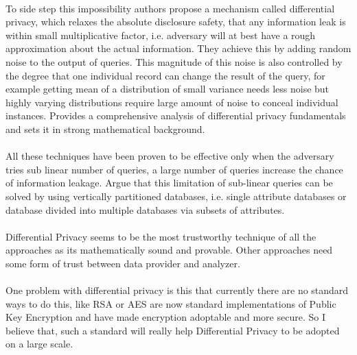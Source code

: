 \documentclass[12pt]{report}
\theoremstyle{named}
\begin{document}
\paragraph{}
To side step this impossibility authors propose a mechanism called differential privacy, which relaxes the absolute disclosure safety, that any information leak is within small multiplicative factor, i.e. adversary will at best have a rough approximation about the actual information. They achieve this by adding random noise to the output of queries. This magnitude of this noise is also controlled by the degree that one individual record can change the result of the query, for example getting mean of a distribution of small variance needs less noise but highly varying distributions require large amount of noise to conceal individual instances. \cite{dwork2014algorithmic} Provides a comprehensive analysis of differential privacy fundamentals and sets it in strong mathematical background. 
\paragraph{}
All these techniques have been proven to be effective only when the adversary tries sub linear number of queries, a large number of queries increase the chance of information leakage\cite{haeberlen2011differential}. \cite{dwork2004privacy} Argue that this limitation of sub-linear queries can be solved by using vertically partitioned databases, i.e. single attribute databases or database divided into multiple databases via subsets of attributes.
\paragraph{}
Differential Privacy seems to be the most trustworthy technique of all the approaches as its mathematically sound and provable. Other approaches need some form of trust between data provider and analyzer.
\paragraph{}
One problem with differential privacy is this that currently there are no standard ways to do this, like RSA or AES are now standard implementations of Public Key Encryption and have made encryption adoptable and more secure. So I believe that, such a standard will really help Differential Privacy to be adopted on a large scale.



\newcommand{\dd}[1]{\mathrm{d}#1}
\end{document}

